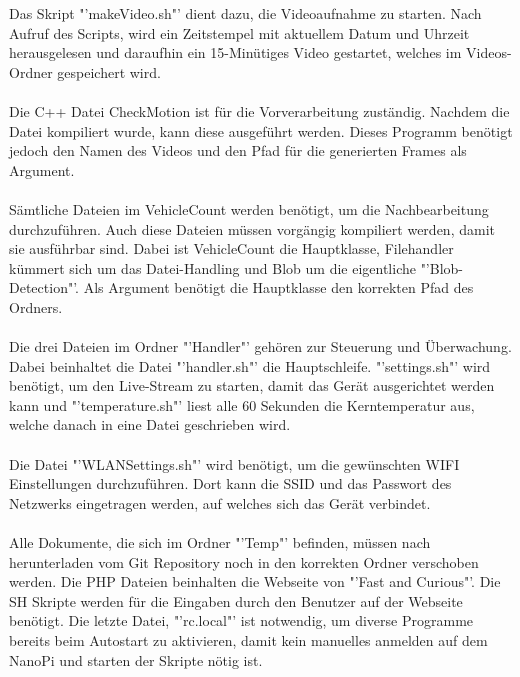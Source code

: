 \renewcommand{\arraystretch}{1}
\setlength\tabcolsep{0pt}

\newpage
Das Skript "'makeVideo.sh"' dient dazu, die Videoaufnahme zu starten. Nach Aufruf des Scripts, wird ein Zeitstempel mit aktuellem Datum und Uhrzeit herausgelesen und daraufhin ein 15-Minütiges Video gestartet, welches im Videos-Ordner gespeichert wird.\\\\
Die C++ Datei CheckMotion ist für die Vorverarbeitung zuständig. Nachdem die Datei kompiliert wurde, kann diese ausgeführt werden. Dieses Programm benötigt jedoch den Namen des Videos und den Pfad für die generierten Frames als Argument.\\\\
Sämtliche Dateien im VehicleCount werden benötigt, um die Nachbearbeitung durchzuführen. Auch diese Dateien müssen vorgängig kompiliert werden, damit sie ausführbar sind. Dabei ist VehicleCount die Hauptklasse, Filehandler kümmert sich um das Datei-Handling und Blob um die eigentliche "'Blob-Detection"'. Als Argument benötigt die Hauptklasse den korrekten Pfad des Ordners.\\\\
Die drei Dateien im Ordner "'Handler"' gehören zur Steuerung und Überwachung. Dabei beinhaltet die Datei "'handler.sh"' die Hauptschleife. "'settings.sh"' wird benötigt, um den Live-Stream zu starten, damit das Gerät ausgerichtet werden kann und "'temperature.sh"' liest alle 60 Sekunden die Kerntemperatur aus, welche danach in eine Datei geschrieben wird.\\\\
Die Datei "'WLANSettings.sh"' wird benötigt, um die gewünschten WIFI Einstellungen durchzuführen. Dort kann die SSID und das Passwort des Netzwerks eingetragen werden, auf welches sich das Gerät verbindet.\\\\
Alle Dokumente, die sich im Ordner "'Temp"' befinden, müssen nach herunterladen vom Git Repository noch in den korrekten Ordner verschoben werden. Die PHP Dateien beinhalten die Webseite von "'Fast and Curious"'. Die SH Skripte werden für die Eingaben durch den Benutzer auf der Webseite benötigt. Die letzte Datei, "'rc.local"' ist notwendig, um diverse Programme bereits beim Autostart zu aktivieren, damit kein manuelles anmelden auf dem NanoPi und starten der Skripte nötig ist.\\\\
